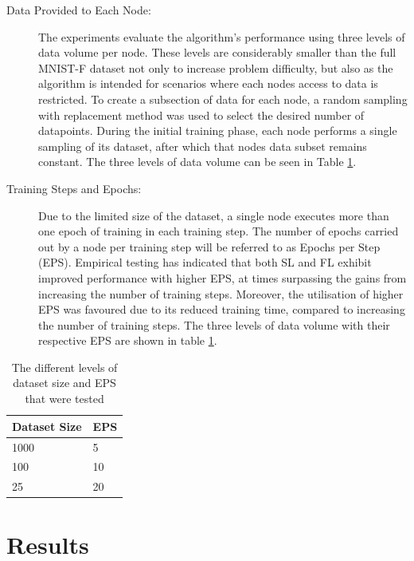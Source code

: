 \documentclass[letterpaper, 10 pt, conference]{ieeeconf}  %
\begin{document}
\begin{description}
	\item [Data Provided to Each Node:] The experiments evaluate the algorithm's performance using three levels of data volume per node. These levels are considerably smaller than the full MNIST-F dataset not only to increase problem difficulty, but also as the algorithm is intended for scenarios where each nodes access to data is restricted. To create a subsection of data for each node, a random sampling with replacement method was used to select the desired number of datapoints. During the initial training phase, each node performs a single sampling of its dataset, after which that nodes data subset remains constant. The three levels of data volume can be seen in Table \ref{epsparams}.
	
	\item [Training Steps and Epochs:] Due to the limited size of the dataset, a single node executes more than one epoch of training in each training step. The number of epochs carried out by a node per training step will be referred to as Epochs per Step (EPS). Empirical testing has indicated that both SL and FL exhibit improved performance with higher EPS, at times surpassing the gains from increasing the number of training steps. Moreover, the utilisation of higher EPS was favoured due to its reduced training time, compared to increasing the number of training steps. The three levels of data volume with their respective EPS are shown in table \ref{epsparams}.
	
\end{description}

\begin{table}[H]
	\centering
	\begin{tabular}{l|l}
		Dataset Size & EPS \\ \hline \hline
		1000   & 5  \\ \hline
		100   & 10  \\ \hline
		25  & 20 
	\end{tabular}
	\caption{The different levels of dataset size and EPS that were tested} \label{epsparams}
\end{table}

\section{Results}
\end{document}
